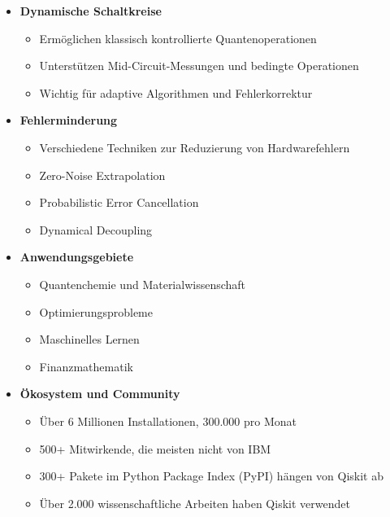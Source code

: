 \begin{itemize}
    \item \textbf{Dynamische Schaltkreise}
    \begin{itemize}
        \item Ermöglichen klassisch kontrollierte Quantenoperationen
        \item Unterstützen Mid-Circuit-Messungen und bedingte Operationen
        \item Wichtig für adaptive Algorithmen und Fehlerkorrektur
    \end{itemize}
    
    \item \textbf{Fehlerminderung}
    \begin{itemize}
        \item Verschiedene Techniken zur Reduzierung von Hardwarefehlern
        \item Zero-Noise Extrapolation
        \item Probabilistic Error Cancellation
        \item Dynamical Decoupling
    \end{itemize}
    
    \item \textbf{Anwendungsgebiete}
    \begin{itemize}
        \item Quantenchemie und Materialwissenschaft
        \item Optimierungsprobleme
        \item Maschinelles Lernen
        \item Finanzmathematik
    \end{itemize}
    
    \item \textbf{Ökosystem und Community}
    \begin{itemize}
        \item Über 6 Millionen Installationen, 300.000 pro Monat
        \item 500+ Mitwirkende, die meisten nicht von IBM
        \item 300+ Pakete im Python Package Index (PyPI) hängen von Qiskit ab
        \item Über 2.000 wissenschaftliche Arbeiten haben Qiskit verwendet
    \end{itemize}
\end{itemize}

